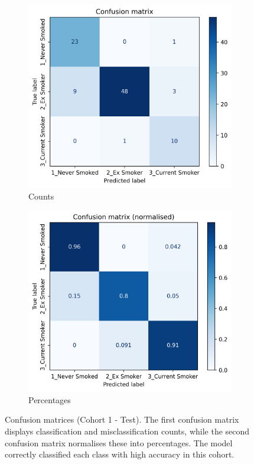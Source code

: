 \documentclass{article} %
\begin{document}
\begin{figure}[p]
    \centering
    \begin{subfigure}{0.49\linewidth}
        \centering
        \includegraphics[width=\linewidth]{cohort1/test_confusion_matrix.png}
        \caption{Counts}
    \end{subfigure}
    \hfill
    \begin{subfigure}{0.49\linewidth}
        \centering
        \includegraphics[width=\linewidth]{cohort1/test_confusion_matrix_normalised.png}
        \caption{Percentages}
    \end{subfigure}
    \caption[Confusion matrices (Cohort 1 - Test)]{Confusion matrices (Cohort 1 - Test). The first confusion matrix displays classification and misclassification counts, while the second confusion matrix normalises these into percentages. The model correctly classified each class with high accuracy in this cohort.}
    \label{fig:cohort1-confusion-matrix}
\end{figure}
\end{document}
